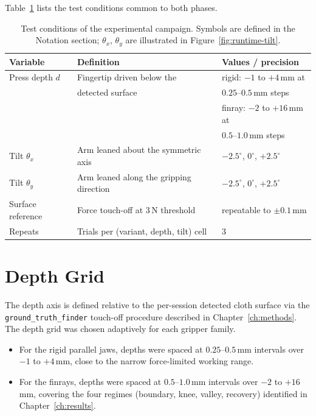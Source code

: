 Table~\ref{tab:test-conditions} lists the test conditions common
to both phases.

\begin{table}[ht]
\centering
\caption[Test conditions]{Test conditions of the experimental campaign.
Symbols are defined in the Notation section; $\theta_x$, $\theta_y$ are
illustrated in Figure~\ref{fig:runtime-tilt}.}
\label{tab:test-conditions}
\small
\begin{tabular}{lll}
\toprule
Variable & Definition & Values / precision \\
\midrule
Press depth $d$ & Fingertip driven below the & rigid: $-1$ to $+4$\,mm at \\
                & detected surface           & \quad $0.25$--$0.5$\,mm steps \\
                &                            & finray: $-2$ to $+16$\,mm at \\
                &                            & \quad $0.5$--$1.0$\,mm steps \\
Tilt $\theta_x$ & Arm leaned about the symmetric axis & $-2.5^{\circ}$, $0^{\circ}$, $+2.5^{\circ}$ \\
Tilt $\theta_y$ & Arm leaned along the gripping direction & $-2.5^{\circ}$, $0^{\circ}$, $+2.5^{\circ}$ \\
Surface reference & Force touch-off at 3\,N threshold & repeatable to $\pm 0.1$\,mm \\
Repeats & Trials per (variant, depth, tilt) cell & 3 \\
\bottomrule
\end{tabular}
\end{table}

\section{Depth Grid}
\label{sec:depth-grid}

The depth axis is defined relative to the per-session detected cloth
surface via the \texttt{ground\_truth\_finder} touch-off procedure
described in Chapter~\ref{ch:methods}. The depth grid was chosen
adaptively for each gripper family.
\begin{itemize}
  \item For the rigid parallel jaws, depths were spaced at $0.25$--$0.5$\,mm
        intervals over $-1$ to $+4$\,mm, close to the narrow
        force-limited working range.
  \item For the finrays, depths were spaced at $0.5$--$1.0$\,mm intervals
        over $-2$ to $+16$\,mm, covering the four regimes
        (boundary, knee, valley, recovery) identified in
        Chapter~\ref{ch:results}.
\end{itemize}

